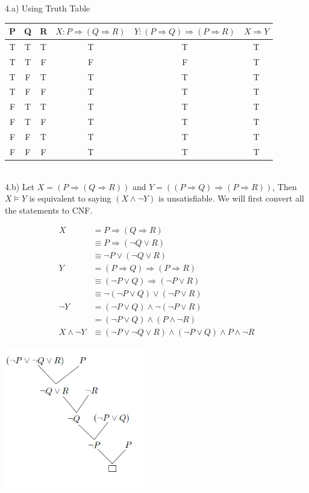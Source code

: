 \documentclass[11pt]{article}
\newcommand{\ra}{\Rightarrow}
\begin{document}
4.a) Using Truth Table

\begin{tabular}{|c|c|c|c|c|c|}
\hline
P & Q & R & $X : P \ra (Q \ra R)$ & $Y : (P \ra Q) \ra (P \ra R)$ &$X \ra Y$  \\
\hline
T & T & T & T	                    & T                             &T \\
T & T & F & F	                    & F                             &T \\ 
T & F & T & T	                    & T                             &T \\ 
T & F & F & T	                    & T                             &T \\ 
F & T & T & T	                    & T                             &T \\ 
F & T & F & T	                    & T                             &T \\ 
F & F & T & T	                    & T                             &T \\ 
F & F & F & T	                    & T                             &T \\ 
\hline
\end{tabular} \\


4.b) Let $X = (P \ra (Q \ra R))$ and $Y = ((P \ra Q) \ra (P \ra R))$, Then $X \models Y$ is
equivalent to saying $(X \land \lnot Y)$ is unsatisfiable. We will first convert all the
statements to CNF.


\begin{align*}
	X &= P \ra ( Q \ra R) \\
		&\equiv P \ra ( \lnot Q \lor R ) \\
		&\equiv \lnot P \lor ( \lnot Q \lor R ) \\
	Y &= (P \ra Q) \ra (P \ra R) \\
		&\equiv (\lnot P \lor Q) \ra (\lnot P \lor R) \\
		&\equiv \lnot (\lnot P \lor Q) \lor (\lnot P \lor R) \\
	\lnot Y &= 	(\lnot P \lor Q) \land \lnot (\lnot P \lor R) \\
	&= (\lnot P \lor Q) \land ( P \land \lnot R ) \\
	X \land \lnot Y &\equiv (\lnot P \lor \lnot Q \lor R ) \land (\lnot P \lor Q) \land P \land \lnot R
\end{align*}

\includegraphics[height=175pt,width=175pt]{4b.jpg}
\end{document}
